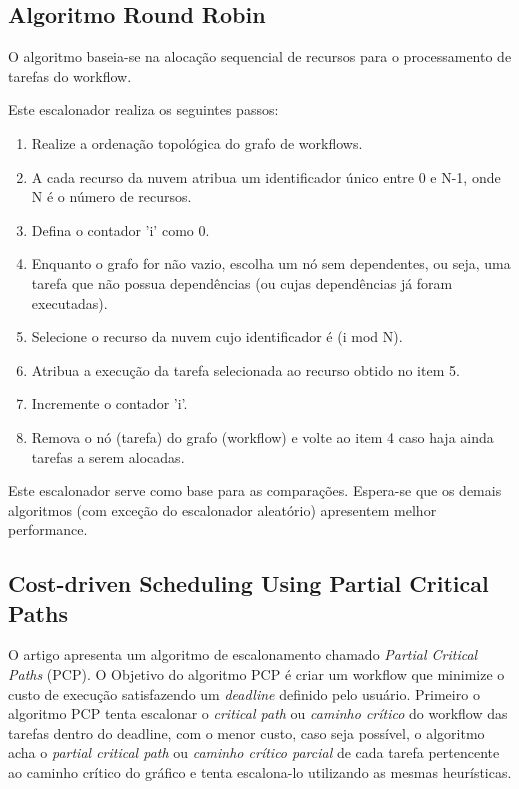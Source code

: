 \documentclass[a4paper,10pt]{article}
\begin{document}
\subsection{Algoritmo Round Robin}

O algoritmo baseia-se na alocação sequencial de recursos para o processamento de tarefas do workflow.

Este escalonador realiza os seguintes passos:

\begin{enumerate}

    \item Realize a ordenação topológica do grafo de workflows.

    \item A cada recurso da nuvem atribua um identificador único entre 0 e N-1, onde N é o número de recursos.

    \item Defina o contador 'i' como 0.

    \item Enquanto o grafo for não vazio, escolha um nó sem dependentes, ou seja, uma tarefa que não possua dependências 
(ou cujas dependências já foram executadas).

    \item Selecione o recurso da nuvem cujo identificador é (i mod N).

    \item Atribua a execução da tarefa selecionada ao recurso obtido no item 5.

    \item Incremente o contador 'i'.

    \item Remova o nó (tarefa) do grafo (workflow) e volte ao item 4 caso haja ainda tarefas a serem alocadas.

\end{enumerate}

Este escalonador serve como base para as comparações. Espera-se que os demais algoritmos (com exceção do escalonador
aleatório) apresentem melhor performance.

\subsection{Cost-driven Scheduling Using Partial Critical Paths}
O artigo \cite{pcp} apresenta um algoritmo de escalonamento chamado \emph{Partial Critical Paths} (PCP). O Objetivo do algoritmo PCP é criar um workflow que minimize o custo de execução satisfazendo um \emph{deadline} definido pelo usuário. Primeiro o algoritmo PCP tenta escalonar o \emph{critical path} ou \emph{caminho crítico} do workflow das tarefas dentro do deadline, com o menor custo, caso seja possível, o algoritmo acha o \emph{partial critical path} ou \emph{caminho crítico parcial} de cada tarefa pertencente ao caminho crítico do gráfico e tenta escalona-lo utilizando as mesmas heurísticas.
\end{document}
